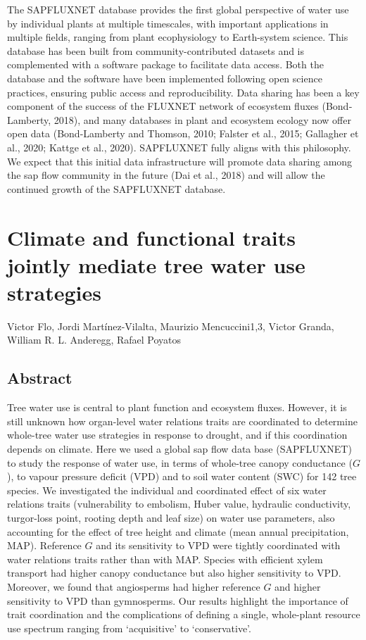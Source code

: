\documentclass[11pt,twoside]{reedthesis}
\begin{document}
The SAPFLUXNET database provides the first global perspective of water
use by individual plants at multiple timescales, with important
applications in multiple fields, ranging from plant ecophysiology to
Earth-system science. This database has been built from
community-contributed datasets and is complemented with a software
package to facilitate data access. Both the database and the software
have been implemented following open science practices, ensuring public
access and reproducibility. Data sharing has been a key component of the
success of the FLUXNET network of ecosystem fluxes (Bond‐Lamberty,
2018), and many databases in plant and ecosystem ecology now offer open
data (Bond-Lamberty and Thomson, 2010; Falster et al., 2015; Gallagher
et al., 2020; Kattge et al., 2020). SAPFLUXNET fully aligns with this
philosophy. We expect that this initial data infrastructure will promote
data sharing among the sap flow community in the future (Dai et al.,
2018) and will allow the continued growth of the SAPFLUXNET database.

\chapter[Climate, functional traits and water use strategies]{Climate and functional traits jointly mediate tree water use strategies}

\setlength{\parindent}{0pt} Victor Flo, Jordi Martínez-Vilalta, Maurizio
Mencuccini1,3, Victor Granda, William R. L. Anderegg, Rafael Poyatos

\newpage

\setlength{\parindent}{30pt}

\section*{Abstract}

Tree water use is central to plant function and ecosystem fluxes.
However, it is still unknown how organ-level water relations traits are
coordinated to determine whole-tree water use strategies in response to
drought, and if this coordination depends on climate. Here we used a
global sap flow data base (SAPFLUXNET) to study the response of water
use, in terms of whole-tree canopy conductance (\(G\)), to vapour
pressure deficit (VPD) and to soil water content (SWC) for 142 tree
species. We investigated the individual and coordinated effect of six
water relations traits (vulnerability to embolism, Huber value,
hydraulic conductivity, turgor-loss point, rooting depth and leaf size)
on water use parameters, also accounting for the effect of tree height
and climate (mean annual precipitation, MAP). Reference \(G\) and its
sensitivity to VPD were tightly coordinated with water relations traits
rather than with MAP. Species with efficient xylem transport had higher
canopy conductance but also higher sensitivity to VPD. Moreover, we
found that angiosperms had higher reference \(G\) and higher sensitivity
to VPD than gymnosperms. Our results highlight the importance of trait
coordination and the complications of defining a single, whole-plant
resource use spectrum ranging from `acquisitive' to `conservative'.\par
\newpage
\end{document}
